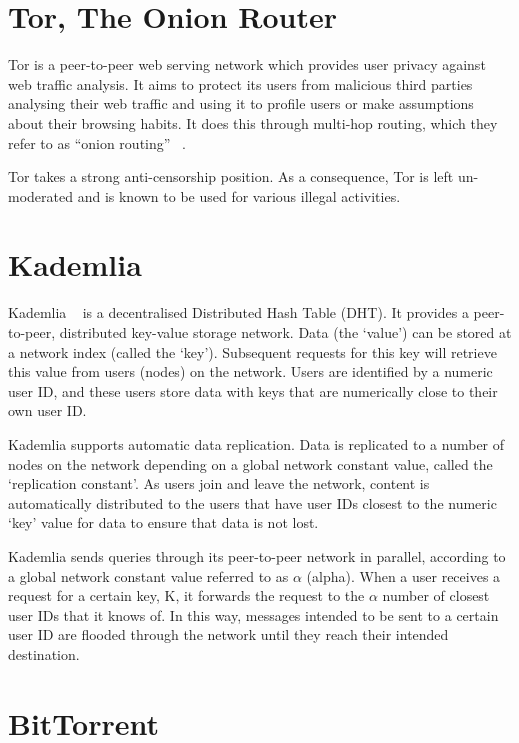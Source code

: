 \section{Tor, The Onion Router}

Tor is a peer-to-peer web serving network which provides user privacy against web traffic analysis.
It aims to protect its users from malicious third parties analysing their web traffic and using it to
profile users or make assumptions about their browsing habits. It does this through multi-hop routing,
which they refer to as ``onion routing'' ~\cite{tor}.

Tor takes a strong anti-censorship position. As a consequence, Tor is left un-moderated and is known
to be used for various illegal activities.

\section{Kademlia}

Kademlia ~\cite{kademlia} is a decentralised Distributed Hash Table (DHT). It provides a peer-to-peer,
distributed key-value storage network. Data (the `value') can be stored at a network index (called the `key').
Subsequent requests for this key will retrieve this value from users (nodes) on the network.
Users are identified by a numeric user ID, and these users store data with keys that are numerically
close to their own user ID.

Kademlia supports automatic data replication. Data is replicated to a number of nodes on the network depending
on a global network constant value, called the `replication constant'.
As users join and leave the network, content is automatically distributed to the users that have user IDs
closest to the numeric `key' value for data to ensure that data is not lost.

Kademlia sends queries through its peer-to-peer network in parallel, according to a global network constant value
referred to as \(\alpha\) (alpha). When a user receives a request for a certain key, K, it forwards the request to the
\(\alpha\) number of closest user IDs that it knows of. In this way, messages intended to be sent to a certain user ID
are flooded through the network until they reach their intended destination.

\section{BitTorrent}

